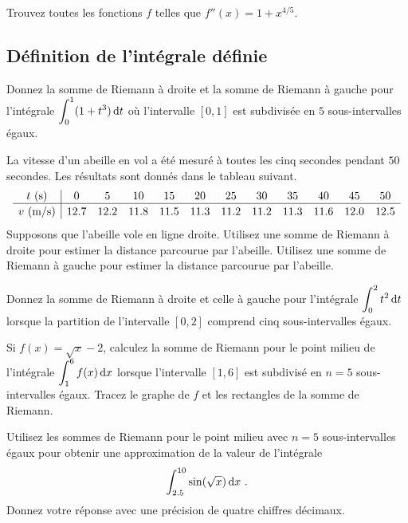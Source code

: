 \begin{question}
Trouvez toutes les fonctions $f$ telles que
$\displaystyle f''(x) = 1 + x^{4/5}$.
\label{7Q8}
\end{question}

\subsection{Définition de l'intégrale définie}

\begin{question}
Donnez la somme de Riemann à droite et la somme de Riemann à gauche
pour l'intégrale $\displaystyle \int_0^1 (1+t^3)\,\mathrm{d}t$ où
l'intervalle $[0,1]$ est subdivisée en $5$ sous-intervalles égaux.
\label{7Q9}
\end{question}

\begin{question}[\life]
La vitesse d'un abeille en vol a été mesuré à toutes les cinq secondes
pendant $50$ secondes.  Les résultats sont donnés dans le tableau suivant.
\[
\begin{array}{c|ccccccccccc}
t \text{ (s)} & 0 & 5 & 10 & 15 & 20 & 25 & 30 & 35 & 40 & 45 & 50 \\
\hline
v \text{ (m/s)} & \rule{0em}{1em} 12.7 & 12.2 & 11.8 & 11.5 & 11.3 & 11.2 &
11.2 & 11.3 & 11.6 & 12.0 & 12.5
\end{array}
\]
Supposons que l'abeille vole en ligne droite.  Utilisez une somme de Riemann
à droite pour estimer la distance parcourue par l'abeille.  Utilisez une
somme de Riemann à gauche pour estimer la distance parcourue par l'abeille.
\label{7Q10}
\end{question}

\begin{question}
Donnez la somme de Riemann à droite et celle à gauche pour l'intégrale
$\displaystyle \int_0^2 t^2 \,\mathrm{d}t$ lorsque la partition de l'intervalle
$[0,2]$ comprend cinq sous-intervalles égaux.
\label{7Q11}
\end{question}

\begin{question}
Si $f(x) = \sqrt{x}-2$, calculez la somme de Riemann
pour le point milieu de l'intégrale
$\displaystyle \int_1^6 f(x)\,\mathrm{d}x$ lorsque l'intervalle $[1,6]$ est
subdivisé en $n=5$ sous-intervalles égaux.  Tracez le graphe de $f$ et
les rectangles de la somme de Riemann.
\label{7Q12}
\end{question}

\begin{question}
Utilisez les sommes de Riemann pour le point milieu avec $n=5$
sous-intervalles égaux pour obtenir une approximation de la valeur de
l'intégrale
\[
\int_{2.5}^{10} \sin(\sqrt{x}) \,\mathrm{d}x \ .
\]
Donnez votre réponse avec une précision de quatre chiffres décimaux.
\label{7Q13}
\end{question}

